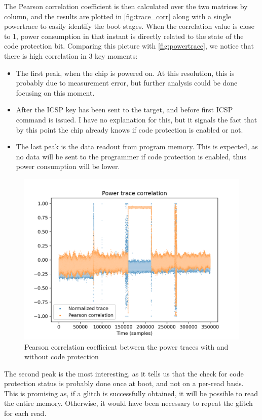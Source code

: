 \documentclass[a4paper,english,twoside,10pt]{article}
\begin{document}
The Pearson correlation coefficient is then calculated over the two matrices by column, and the results are plotted in \autoref{fig:trace_corr} along with a single powertrace to easily identify the boot stages. When the correlation value is close to 1, power consumption in that instant is directly related to the state of the code protection bit. Comparing this picture with \autoref{fig:powertrace}, we notice that there is high correlation in 3 key moments:
\begin{itemize}
	\item The first peak, when the chip is powered on. At this resolution, this is probably due to measurement error, but further analysis could be done focusing on this moment.
	\item After the ICSP key has been sent to the target, and before first ICSP command is issued. I have no explanation for this, but it signals the fact that by this point the chip already knows if code protection is enabled or not.
	\item The last peak is the data readout from program memory. This is expected, as no data will be sent to the programmer if code protection is enabled, thus power consumption will be lower.
\end{itemize}

\begin{figure}[htbp]
	\centering%
	\includegraphics[width=.75\textwidth]{seaborn_trace_correlation.png}
	\caption{Pearson correlation coefficient between the power traces with and without code protection}
	\label{fig:trace_corr}
\end{figure}

The second peak is the most interesting, as it tells us that the check for code protection status is probably done once at boot, and not on a per-read basis. This is promising as, if a glitch is successfully obtained, it will be possible to read the entire memory. Otherwise, it would have been necessary to repeat the glitch for each read.
\end{document}

